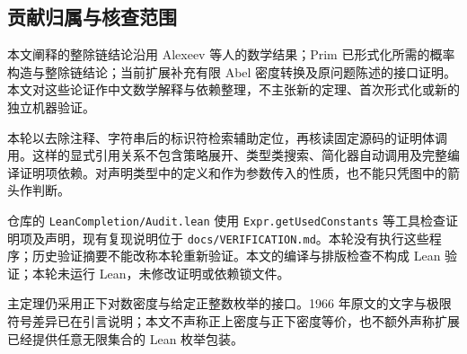 \subsection{贡献归属与核查范围}
本文阐释的整除链结论沿用 Alexeev 等人的数学结果；Prim 已形式化所需的概率构造与整除链结论；当前扩展补充有限 Abel 密度转换及原问题陈述的接口证明。本文对这些论证作中文数学解释与依赖整理，不主张新的定理、首次形式化或新的独立机器验证。

本轮以去除注释、字符串后的标识符检索辅助定位，再核读固定源码的证明体调用。这样的显式引用关系不包含策略展开、类型类搜索、简化器自动调用及完整编译证明项依赖。对声明类型中的定义和作为参数传入的性质，也不能只凭图中的箭头作判断。

仓库的 \nolinkurl{LeanCompletion/Audit.lean} 使用 \nolinkurl{Expr.getUsedConstants} 等工具检查证明项及声明，现有复现说明位于 \nolinkurl{docs/VERIFICATION.md}。本轮没有执行这些程序；历史验证摘要不能改称本轮重新验证。本文的编译与排版检查不构成 Lean 验证；本轮未运行 Lean，未修改证明或依赖锁文件。

主定理仍采用正下对数密度与给定正整数枚举的接口。1966 年原文的文字与极限符号差异已在引言说明；本文不声称正上密度与正下密度等价，也不额外声称扩展已经提供任意无限集合的 Lean 枚举包装。
